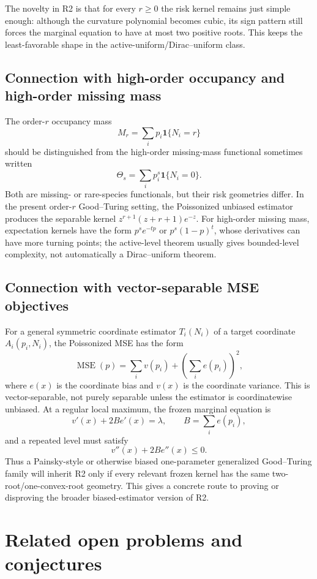 \documentclass[11pt]{article}
\theoremstyle{definition}
\newcommand{\one}{\mathbf 1}
\begin{document}
The novelty in R2 is that for every $r\ge0$ the risk kernel remains just simple enough: although the curvature polynomial becomes cubic, its sign pattern still forces the marginal equation to have at most two positive roots.  This keeps the least-favorable shape in the active-uniform/Dirac--uniform class.

\subsection{Connection with high-order occupancy and high-order missing mass}

The order-$r$ occupancy mass
\[
  M_r=\sum_i p_i\one\{N_i=r\}
\]
should be distinguished from the high-order missing-mass functional sometimes written
\[
  \Theta_s=\sum_i p_i^s\one\{N_i=0\}.
\]
Both are missing- or rare-species functionals, but their risk geometries differ.  In the present order-$r$ Good--Turing setting, the Poissonized unbiased estimator produces the separable kernel $z^{r+1}(z+r+1)e^{-z}$.  For high-order missing mass, expectation kernels have the form $p^s e^{-t p}$ or $p^s(1-p)^t$, whose derivatives can have more turning points; the active-level theorem usually gives bounded-level complexity, not automatically a Dirac--uniform theorem.

\subsection{Connection with vector-separable MSE objectives}\label{sec:biased-generalized}

For a general symmetric coordinate estimator $T_i(N_i)$ of a target coordinate $A_i(p_i,N_i)$, the Poissonized MSE has the form
\[
  \operatorname{MSE}(p)
  =\sum_i v(p_i)+\left(\sum_i e(p_i)\right)^2,
\]
where $e(x)$ is the coordinate bias and $v(x)$ is the coordinate variance.  This is vector-separable, not purely separable unless the estimator is coordinatewise unbiased.  At a regular local maximum, the frozen marginal equation is
\[
  v'(x)+2B e'(x)=\lambda,
  \qquad B=\sum_i e(p_i),
\]
and a repeated level must satisfy
\[
  v''(x)+2B e''(x)\le0.
\]
Thus a Painsky-style or otherwise biased one-parameter generalized Good--Turing family will inherit R2 only if every relevant frozen kernel has the same two-root/one-convex-root geometry.  This gives a concrete route to proving or disproving the broader biased-estimator version of R2.

\section{Related open problems and conjectures}
\end{document}
